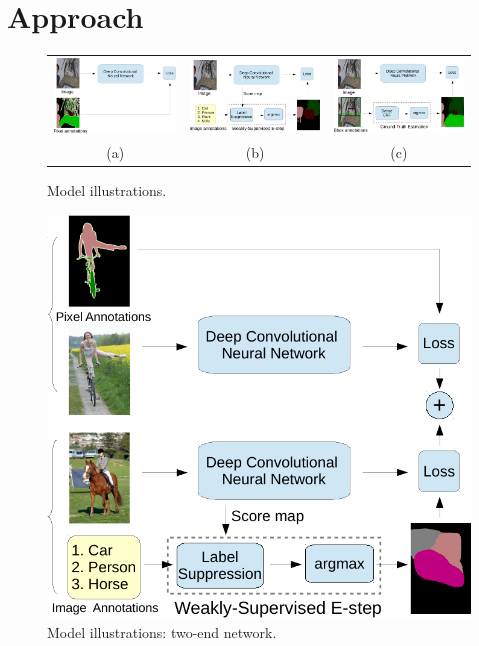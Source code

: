 \section{Approach}

\begin{figure}[ht]
  \centering
  \begin{tabular}{c c c}
    \includegraphics[height=0.17\linewidth]{fig/model_train_pixel.pdf} & 
    \includegraphics[height=0.17\linewidth]{fig/model_train_image.pdf} & 
    \includegraphics[height=0.17\linewidth]{fig/model_train_bbox.pdf}  \\
    (a) &
    (b) &
    (c) 
  \end{tabular}
  \caption{Model illustrations.}
  \label{fig:model_illustrations}
\end{figure}

\begin{figure}[ht]
  \centering
  \includegraphics[width=0.9\linewidth]{fig/model_train_twoEnd.pdf} 
  \caption{Model illustrations: two-end network.}
  \label{fig:model_illustrations_twoEnd}
\end{figure}



